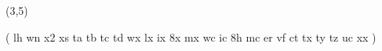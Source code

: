 %
%
%
%
%
%
%

\lhvercheck(3,5)

%
%
%
%
%
%
%
%
%
\tablevalues                            ( lh wn      x2 xs  ta tb tc td    wx lx ix 8x mx    wc ic 8h mc    er vf ct    tx  ty tz   uc xx  )

